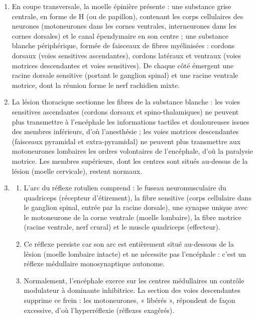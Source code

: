 \documentclass[11pt]{article}
\newcommand{\cle}[1]{{\popxbold\color{popdark}#1}}
\begin{document}
\begin{corrige}
\begin{enumerate}
\item En coupe transversale, la moelle épinière présente : une \cle{substance grise} centrale, en forme de H (ou de papillon), contenant les \cle{corps cellulaires} des neurones (motoneurones dans les cornes ventrales, interneurones dans les cornes dorsales) et le canal épendymaire en son centre ; une \cle{substance blanche} périphérique, formée de \cle{faisceaux de fibres myélinisées} : cordons dorsaux (voies sensitives ascendantes), cordons latéraux et ventraux (voies motrices descendantes et voies sensitives). De chaque côté émergent une racine dorsale sensitive (portant le ganglion spinal) et une racine ventrale motrice, dont la réunion forme le nerf rachidien mixte.
\item La lésion thoracique sectionne les fibres de la substance blanche : les \cle{voies sensitives ascendantes} (cordons dorsaux et spino-thalamiques) ne peuvent plus transmettre à l'encéphale les informations tactiles et douloureuses issues des membres inférieurs, d'où l'anesthésie ; les \cle{voies motrices descendantes} (faisceaux pyramidal et extra-pyramidal) ne peuvent plus transmettre aux motoneurones lombaires les ordres volontaires de l'encéphale, d'où la paralysie motrice. Les membres supérieurs, dont les centres sont situés au-dessus de la lésion (moelle cervicale), restent normaux.
\item \begin{enumerate}
\item L'arc du réflexe rotulien comprend : le \cle{fuseau neuromusculaire} du quadriceps (récepteur d'étirement), la fibre sensitive (corps cellulaire dans le ganglion spinal, entrée par la racine dorsale), une \cle{synapse unique} avec le motoneurone de la corne ventrale (moelle lombaire), la fibre motrice (racine ventrale, nerf crural) et le muscle quadriceps (effecteur).
\item Ce réflexe persiste car son arc est entièrement situé \cle{au-dessous de la lésion} (moelle lombaire intacte) et ne nécessite pas l'encéphale : c'est un réflexe médullaire monosynaptique autonome.
\item Normalement, l'encéphale exerce sur les centres médullaires un contrôle modulateur à dominante \cle{inhibitrice}. La section des voies descendantes supprime ce frein : les motoneurones, « libérés », répondent de façon excessive, d'où l'\cle{hyperréflexie} (réflexes exagérés).

\end{enumerate}
\end{enumerate}
\end{corrige}
\end{document}
